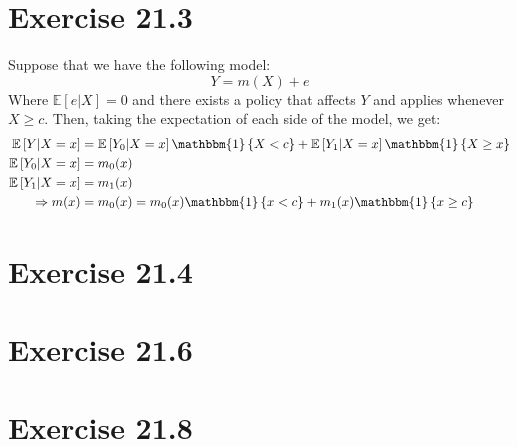 \documentclass{article}
\newcommand{\one}[1]{\mathbbm{1}\left\{#1\right\}}
\newcommand{\E}[1]{\mathbb{E}\left[#1\right]}%
\begin{document}

\section*{Exercise 21.3}
Suppose that we have the following model:
\[
	Y = m(X) + e 
\]
Where $\E{e|X}=0$ and there exists a policy that affects $Y$ and applies whenever ${X\geq c}$. Then, taking the expectation of each side of the model, we get:
\begin{align*}
			\E{Y|X=x} 	&= \E{Y_0|X=x}\one{X<c} + \E{Y_1|X=x}\one{X\geq x}	\\
			\E{Y_0|X=x}	&= m_0(x) \\ \E{Y_1|X=x} &= m_1(x)					\\
	\Rightarrow m(x)	&= m_0(x) = m_0(x)\one{x<c} + m_1(x)\one{x\geq c}
\end{align*}


\section*{Exercise 21.4}



\section*{Exercise 21.6}



\section*{Exercise 21.8}


\end{document}
